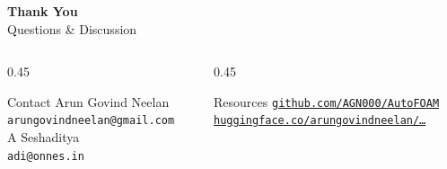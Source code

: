 \documentclass[aspectratio=169,10pt]{beamer}
\begin{document}
\begin{frame}{}
  \centering
  \vspace{20pt}
  {\Huge\color{autoBlue}\textbf{Thank You}}\\[12pt]
  {\large Questions \& Discussion}\\[20pt]
  \begin{columns}
    \begin{column}{0.45\textwidth}
      \begin{block}{Contact}
        Arun Govind Neelan\\
        \texttt{arungovindneelan@gmail.com}\\[4pt]
        A Seshaditya\\
        \texttt{adi@onnes.in}
      \end{block}
    \end{column}
    \begin{column}{0.45\textwidth}
      \begin{block}{Resources}
        \scriptsize
        \href{https://github.com/AGN000/AutoFOAM}{\texttt{github.com/AGN000/AutoFOAM}}\\
        \href{https://huggingface.co/arungovindneelan/foam-cfd-unified-14b}{\texttt{huggingface.co/arungovindneelan/\ldots}}
      \end{block}
    \end{column}
  \end{columns}
\end{frame}
\end{document}
